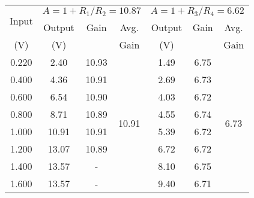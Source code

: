 \begin{table}[H]
    \centering
    \begin{tabular}{|c|ccc|ccc|}
    \hline
    \multirow{2}{*}{Input} & \multicolumn{3}{c|}{$A=1+R_1/R_2=10.87$} & \multicolumn{3}{c|}{$A=1+R_3/R_4=6.62$}                                              \\ \cline{2-7} 
                 &   \multicolumn{1}{c|}{Output}              & \multicolumn{1}{c|}{Gain} &  Avg.              & \multicolumn{1}{c|}{Output}              & \multicolumn{1}{c|}{Gain} &  Avg.      \\ 
                 (V)       &   \multicolumn{1}{c|}{(V)}              & \multicolumn{1}{c|}{} &  Gain              & \multicolumn{1}{c|}{(V)}              & \multicolumn{1}{c|}{} & Gain      \\ \hline
    0.220            & \multicolumn{1}{c|}{2.40} & \multicolumn{1}{c|}{10.93} & \multirow{10}{*}{10.91} & \multicolumn{1}{c|}{1.49} & \multicolumn{1}{c|}{6.75} & \multirow{11}{*}{6.73} \\ \cline{1-3} \cline{5-6}
    0.400                  & \multicolumn{1}{c|}{4.36} & \multicolumn{1}{c|}{10.91} &                    & \multicolumn{1}{c|}{2.69} & \multicolumn{1}{c|}{6.73} &                    \\ \cline{1-3} \cline{5-6}
    0.600                  & \multicolumn{1}{c|}{6.54} & \multicolumn{1}{c|}{10.90} &                    & \multicolumn{1}{c|}{4.03} & \multicolumn{1}{c|}{6.72} &                    \\ \cline{1-3} \cline{5-6}
    0.800                  & \multicolumn{1}{c|}{8.71} & \multicolumn{1}{c|}{10.89} &                    & \multicolumn{1}{c|}{4.55} & \multicolumn{1}{c|}{6.74} &                    \\ \cline{1-3} \cline{5-6}
    1.000                  & \multicolumn{1}{c|}{10.91} & \multicolumn{1}{c|}{10.91} &                    & \multicolumn{1}{c|}{5.39} & \multicolumn{1}{c|}{6.72} &                    \\ \cline{1-3} \cline{5-6}
    1.200                  & \multicolumn{1}{c|}{13.07} & \multicolumn{1}{c|}{10.89} &                    & \multicolumn{1}{c|}{6.72} & \multicolumn{1}{c|}{6.72} &                    \\ \cline{1-3} \cline{5-6}
    1.400                  & \multicolumn{1}{c|}{13.57} & \multicolumn{1}{c|}{-} &                    & \multicolumn{1}{c|}{8.10} & \multicolumn{1}{c|}{6.75} &                    \\ \cline{1-3} \cline{5-6}
    1.600                  & \multicolumn{1}{c|}{13.57} & \multicolumn{1}{c|}{-} &                    & \multicolumn{1}{c|}{9.40} & \multicolumn{1}{c|}{6.71} &                    \\ \cline{1-3} \cline{5-6}

\end{tabular}
\end{table}

